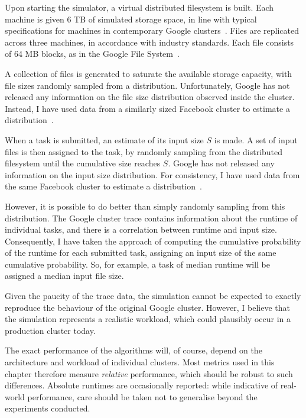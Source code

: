 Upon starting the simulator, a virtual distributed filesystem is built. Each machine is given 6 TB of simulated storage space, in line with typical specifications for machines in contemporary Google clusters~\cite{GoogleSlideDeck}. Files are replicated across three machines, in accordance with industry standards\footnotemark. Each file consists of 64 MB blocks, as in the Google File System~\cite{Ghemawat}.

A collection of files is generated to saturate the available storage capacity\footnotemark, with file sizes randomly sampled from a distribution. Unfortunately, Google has not released any information on the file size distribution observed inside the cluster. Instead, I have used data from a similarly sized Facebook cluster to estimate a distribution~\cite{Chen}.

When a task is submitted, an estimate of its input size $S$ is made. A set of input files is then assigned to the task, by randomly sampling from the distributed filesystem until the cumulative size reaches $S$. Google has not released any information on the input size distribution. For consistency, I have used data from the same Facebook cluster to estimate a distribution~\cite{Chen}.

However, it is possible to do better than simply randomly sampling from this distribution. The Google cluster trace contains information about the runtime of individual tasks, and there is a correlation between runtime and input size. Consequently, I have taken the approach of computing the cumulative probability of the runtime for each submitted task, assigning an input size of the same cumulative probability. So, for example, a task of median runtime will be assigned a median input file size.

Given the paucity of the trace data, the simulation cannot be expected to exactly reproduce the behaviour of the original Google cluster. However, I believe that the simulation represents a realistic workload, which could plausibly occur in a production cluster today. 

The exact performance of the algorithms will, of course, depend on the architecture and workload of individual clusters. Most metrics used in this chapter therefore measure \emph{relative} performance, which should be robust to such differences. Absolute runtimes are occasionally reported: while indicative of real-world performance, care should be taken not to generalise beyond the experiments conducted.

